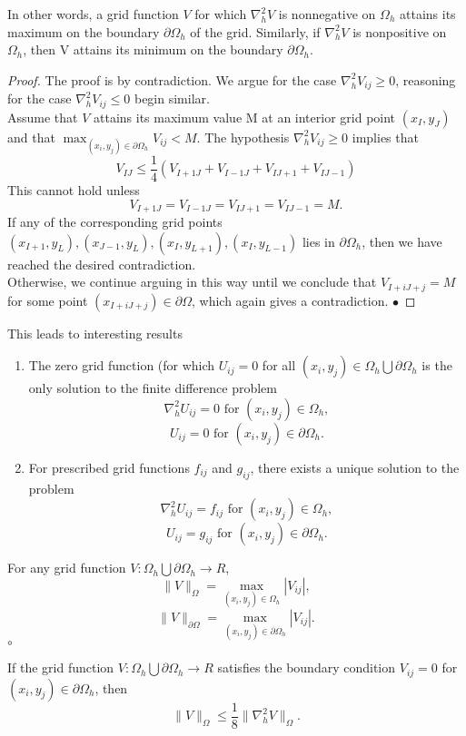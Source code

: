 In other words, a grid function $V$ for which $\nabla^2_hV$ is nonnegative on $\Omega_h$ attains its maximum on the boundary $\partial\Omega_h$ of the grid.  Similarly, if $\nabla^2_hV$ is nonpositive on $\Omega_h$, then V attains its minimum on the boundary $\partial\Omega_h$.
\begin{proof}
The proof is by contradiction.  We argue for the case $\nabla_h^2V_{ij} \geq 0$, reasoning for the case $\nabla_h^2V_{ij}\leq 0$ begin similar.\\
Assume that $V$ attains its maximum value M at an interior grid point $(x_I,y_J)$ and that $\max_{(x_i,y_j)\in\partial\Omega_h}V_{ij}<M.$ The hypothesis $\nabla_{h}^2V_{ij} \geq 0$ implies that
\[ V_{IJ}\leq\frac{1}{4}(V_{I+1J}+V_{I-1J}+V_{IJ+1}+V_{IJ-1}) \]
This cannot hold unless
\[ V_{I+1J}=V_{I-1J}=V_{IJ+1}=V_{IJ-1}=M. \]
If any of the corresponding grid points $(x_{I+1},y_{L}),(x_{J-1},y_{L}),(x_{I},y_{L+1}),(x_{I},y_{L-1})$ lies in $\partial\Omega_h$, then we have reached the 
desired contradiction.\\
Otherwise, we continue arguing in this way until we conclude that $V_{I+iJ+j}=M$
for some point $(x_{I+iJ+j})\in \partial\Omega$, which again gives a contradiction.
$\bullet$\end{proof}
This leads to interesting results
\begin{proposition}
\begin{enumerate}
\item
The zero grid function (for which $U_{ij}=0$ for all $(x_i,y_j) \in \Omega_h \bigcup \partial\Omega_h$
is the only solution to the finite difference problem
\[\nabla_h^2U_{ij}=0 \mbox{ for }(x_i,y_j)\in\Omega_h,\]
\[U_{ij}=0 \mbox{ for }(x_i,y_j)\in\partial\Omega_h.\]
\item
For prescribed grid functions $f_{ij}$ and $g_{ij}$, there exists a unique solution to the problem
\[\nabla_h^2U_{ij}=f_{ij} \mbox{ for }(x_i,y_j)\in\Omega_h,\]
\[U_{ij}=g_{ij} \mbox{ for }(x_i,y_j)\in\partial\Omega_h.\]
\end{enumerate}
\end{proposition}
\begin{definition}
For any grid function $V:\Omega_h\bigcup\partial\Omega_h \rightarrow R$,
\[\lVert V\rVert_{\Omega} =\max_{(x_i,y_j)\in\Omega_h}|V_{ij}|, \]
\[\lVert V\rVert_{\partial\Omega} =\max_{(x_i,y_j)\in\partial\Omega_h}|V_{ij}|. \]
$\circ$
\end{definition}
\begin{lemma}
If the grid function $V:\Omega_h\bigcup\partial\Omega_h\rightarrow R$ satisfies the boundary condition $V_{ij}=0$ for $(x_i,y_j)\in \partial\Omega_h$, then
\[\lVert V\rVert_{\Omega}\leq \frac{1}{8}\lVert \nabla_h^2V\rVert_{\Omega}. \]
\end{lemma}
